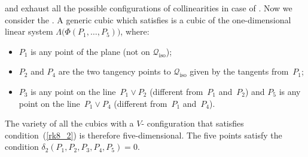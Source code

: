 \documentclass[a4paper, 11pt, reqno]{amsart}
\theoremstyle{plain}
\theoremstyle{definition}
\newcommand{\iso}{\mathcal{Q}_{\mathrm{iso}}}
\begin{document}
 and  exhaust all the possible configurations
of collinearities in case of .
Now we consider the .
%
A generic cubic which satisfies  is
a cubic of the one-dimensional linear system
$\Lambda\bigl(\Phi(P_1, \dotsc, P_5)\bigr)$, where:
%
\begin{itemize}
  \item $P_1$ is any point of the plane (not on $\iso$);
  \item $P_2$ and $P_4$ are the two tangency points to $\iso$ given by the tangents from~$P_1$;
  \item $P_3$ is any point on the line~$P_1 \vee P_2$ (different from~$P_1$ and~$P_2$)
  and $P_5$ is any point on the line~$P_1 \vee P_4$ (different from~$P_1$ and~$P_4$).
\end{itemize}
%
The variety of all the cubics with a $V$- configuration
that satisfies condition~(\ref{rk8_2}) is therefore five-dimensional.
The five points satisfy the condition $\delta_2(P_1, P_2, P_3, P_4, P_5) = 0$.
\end{document}
